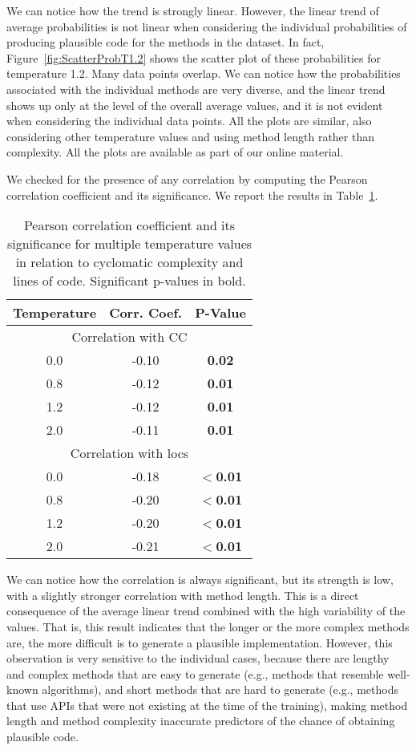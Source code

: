 We can notice how the trend is strongly linear. However, the linear trend of average probabilities is not linear when considering the individual probabilities of producing plausible code for the methods in the dataset. In fact, Figure~\ref{fig:ScatterProbT1.2} shows the scatter plot of these probabilities for temperature 1.2. Many data points overlap. We can notice how the probabilities associated with the individual methods are very diverse, and the linear trend shows up only at the level of the overall average values, and it is not evident when considering the individual data points. All the plots are similar, also considering other temperature values and using method length rather than complexity. All the plots are available as part of our online material.

We checked for the presence of any correlation by computing the Pearson correlation coefficient and its significance. We report the results in Table~\ref{tab:correlation}.

\begin{table}[ht]
\caption{Pearson correlation coefficient and its significance for multiple temperature values in relation to cyclomatic complexity and lines of code. Significant p-values in bold.}

\centering
\begin{tabular}{ccc}

\textbf{Temperature} & \textbf{Corr. Coef.} & \textbf{P-Value}  \\
\toprule
\multicolumn{3}{c}{Correlation with CC} \\
\midrule
0.0 & -0.10 & \textbf{0.02} \\
0.8 & -0.12 & \textbf{0.01} \\
1.2 & -0.12 & \textbf{0.01} \\
2.0 & -0.11 & \textbf{0.01} \\
\toprule
\multicolumn{3}{c}{Correlation with locs} \\
\midrule
0.0 & -0.18 & \textbf{$<$0.01} \\
0.8 & -0.20 & \textbf{$<$0.01} \\
1.2 & -0.20 & \textbf{$<$0.01} \\
2.0 & -0.21 & \textbf{$<$0.01} \\
\bottomrule

\end{tabular}
\label{tab:correlation}
\end{table}

We can notice how the correlation is always significant, but its strength is low, with a slightly stronger correlation with method length. This is a direct consequence of the average linear trend combined with the high variability of the values. That is, this result indicates that the longer or the more complex methods are, the more difficult is to generate a plausible implementation. However, this observation is very sensitive to the individual cases, because there are lengthy and complex methods that are easy to generate (e.g., methods that resemble well-known algorithms), and short methods that are hard to generate (e.g., methods that use APIs that were not existing at the time of the training), making method length and method complexity inaccurate predictors of the chance of obtaining plausible code. 

